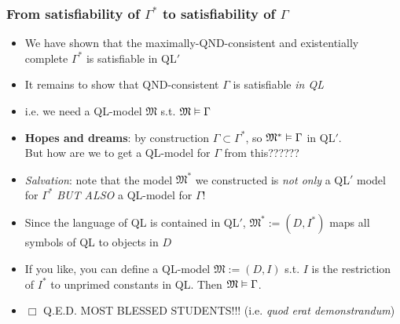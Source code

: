 \begin{frame}
\frametitle{From satisfiability of $\Gamma^{\ast}$ to satisfiability of $\Gamma$}

\begin{itemize}[<+->]

\item We have shown that the maximally-QND-consistent and existentially complete $\Gamma^{\ast}$ is satisfiable in QL$'$ 

\item It remains to show that QND-consistent $\Gamma$ is satisfiable \emph{in QL}

\item i.e. we need a QL-model $\mathfrak{M}$ s.t. $\mathfrak{M} \vDash \Gamma$

\item \textbf{\textcolor{OGlyallpink}{Hopes and dreams}}: by construction $\Gamma \subset \Gamma^{\ast}$, so $\mathfrak{M}^{\ast} \vDash \Gamma$ in QL$'$. \\ But how are we to get a QL-model for $\Gamma$ from this??????

\item \emph{Salvation}: note that the model $\mathfrak{M}^{\ast}$ we constructed is \textit{not only} a QL$'$ model for $\Gamma^{\ast}$  \textit{BUT ALSO} a QL-model for  $\Gamma$!

\item Since the language of QL is contained in QL$'$, $\mathfrak{M}^{\ast} := (D, I^{\ast})$ maps all symbols of QL to objects in $D$

\item If you like, you can define a QL-model $\mathfrak{M} := (D, I)$ s.t. $I$ is the restriction of $I^{\ast}$ to unprimed constants in QL. Then $\mathfrak{M} \vDash \Gamma$. 

\item $\Box$ Q.E.D. MOST BLESSED STUDENTS!!! (i.e. \textit{quod erat demonstrandum})




\end{itemize}
\end{frame}
